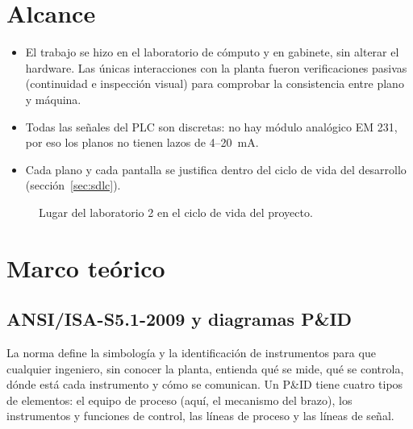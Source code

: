 \documentclass[a4paper,11pt]{article}
\begin{document}
\section{Alcance}
\begin{itemize}
\item El trabajo se hizo en el laboratorio de cómputo y en gabinete, sin alterar el hardware. Las únicas interacciones con la planta fueron verificaciones pasivas (continuidad e inspección visual) para comprobar la consistencia entre plano y máquina.
\item Todas las señales del PLC son discretas: no hay módulo analógico EM 231, por eso los planos no tienen lazos de 4--20~mA.
\item Cada plano y cada pantalla se justifica dentro del ciclo de vida del desarrollo (sección~\ref{sec:sdlc}).
\end{itemize}

\begin{figure}[H]
\centering
{}
\caption{Lugar del laboratorio 2 en el ciclo de vida del proyecto.}
\end{figure}

\section{Marco teórico}
\subsection{ANSI/ISA-S5.1-2009 y diagramas P\&ID}
La norma define la simbología y la identificación de instrumentos para que cualquier ingeniero, sin conocer la planta, entienda qué se mide, qué se controla, dónde está cada instrumento y cómo se comunican. Un P\&ID tiene cuatro tipos de elementos: el equipo de proceso (aquí, el mecanismo del brazo), los instrumentos y funciones de control, las líneas de proceso y las líneas de señal.
\end{document}
